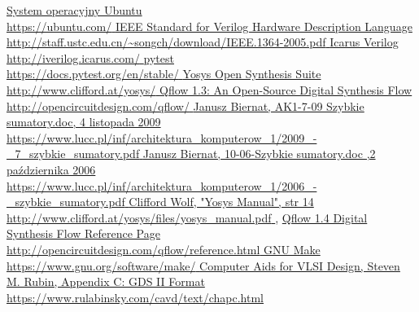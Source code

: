 \documentclass[12pt,oneside,reqno]{article}
\begin{document}

\begin{thebibliography}{9}
    \href{https://ubuntu.com/}{
        System operacyjny Ubuntu\\
        \url{https://ubuntu.com/}
    }
    \href{http://staff.ustc.edu.cn/~songch/download/IEEE.1364-2005.pdf}{
        IEEE Standard for Verilog Hardware Description Language \\
        \url{http://staff.ustc.edu.cn/~songch/download/IEEE.1364-2005.pdf}
    }
    \href{http://iverilog.icarus.com/}{
        Icarus Verilog\\
        \url{http://iverilog.icarus.com/}
    }
    \href{https://docs.pytest.org/en/stable/}{
        pytest\\
        \url{https://docs.pytest.org/en/stable/}
    }
     \href{http://www.clifford.at/yosys/}{
        Yosys Open Synthesis Suite\\
        \url{http://www.clifford.at/yosys/}
    }
    \href{http://opencircuitdesign.com/qflow/}{
        Qflow 1.3: An Open-Source Digital Synthesis Flow\\
        \url{http://opencircuitdesign.com/qflow/}
    }
     \href{https://www.lucc.pl/inf/architektura_komputerow_1/2009_-_7_szybkie_sumatory.pdf}{
         Janusz Biernat, AK1-7-09 Szybkie sumatory.doc, 4 listopada 2009\\
        \url{https://www.lucc.pl/inf/architektura\_komputerow\_1/2009_-_7_szybkie_sumatory.pdf}
    }
     \href{https://www.lucc.pl/inf/architektura_komputerow_1/2006_-_szybkie_sumatory.pdf}{Janusz Biernat, 10-06-Szybkie sumatory.doc ,2 października 2006\\
    \url{https://www.lucc.pl/inf/architektura_komputerow_1/2006_-_szybkie_sumatory.pdf}
    }
     \href{http://www.clifford.at/yosys/files/yosys_manual.pdf}{
    Clifford Wolf, "Yosys Manual", str 14\\
    \url{http://www.clifford.at/yosys/files/yosys_manual.pdf}
    }, 
     \href{http://opencircuitdesign.com/qflow/reference.html}{
        Qflow 1.4 Digital Synthesis Flow Reference Page\\
        \url{http://opencircuitdesign.com/qflow/reference.html}
    }
    \href{https://www.gnu.org/software/make/}{
    GNU Make
    \url{https://www.gnu.org/software/make/}
    }
    \href{https://www.rulabinsky.com/cavd/text/chapc.html}{
        Computer Aids for VLSI Design, 
        Steven M. Rubin, 
        Appendix C: GDS II Format
        \url{https://www.rulabinsky.com/cavd/text/chapc.html}
    }
\end{thebibliography}
\end{document}
